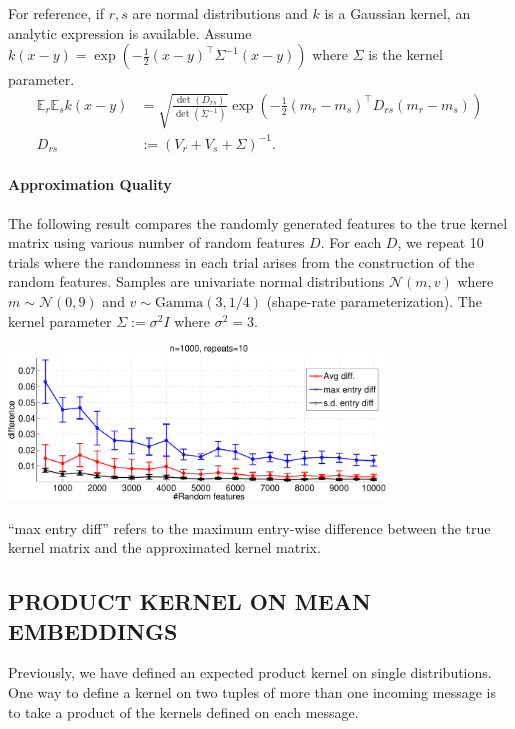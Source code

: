 \documentclass[english]{article}
\theoremstyle{plain}
\theoremstyle{plain}
\begin{document}
For reference, if $r, s$ are normal distributions and $k$
is a Gaussian kernel, an analytic expression is available. Assume
$k(x-y)=\exp\left(-\frac{1}{2}\left(x-y\right)^{\top}\Sigma^{-1}\left(x-y\right)\right)$
where $\Sigma$ is the kernel parameter.
\begin{align*}
\mathbb{E}_{r}\mathbb{E}_{s}k(x-y) & =\sqrt{\frac{\det(D_{rs})}{\det(\Sigma^{-1})}}\exp\left(-\frac{1}{2}\left(m_{r}-m_{s}\right)^{\top}D_{rs}\left(m_{r}-m_{s}\right)\right)\\
D_{rs} & :=\left(V_{r}+V_{s}+\Sigma\right)^{-1}.
\end{align*}

\paragraph{Approximation Quality}

{} The following result compares the randomly generated features to
the true kernel matrix using various number of random features $D$. 
For each $D$, we repeat 10 trials where the randomness in each trial 
arises from the construction of the random features. 
Samples are univariate normal distributions $\mathcal{N}(m, v)$ where 
$m \sim \mathcal{N}(0, 9)$ and $v \sim \text{Gamma}(3, 1/4)$ (shape-rate 
parameterization). The kernel parameter $\Sigma:=\sigma^2 I$ where $\sigma^2=3$.

\begin{center}
\includegraphics[width=10cm]{img/primal_egauss_sanity-crop}
\end{center}

``max entry diff''
refers to the maximum entry-wise difference between the true kernel
matrix and the approximated kernel matrix.

\subsection{PRODUCT KERNEL ON MEAN EMBEDDINGS}
Previously, we have defined an expected product kernel on single distributions.
One way to define a kernel on two tuples of more than one incoming message is to take 
a product of the kernels defined on each message.
\end{document}
